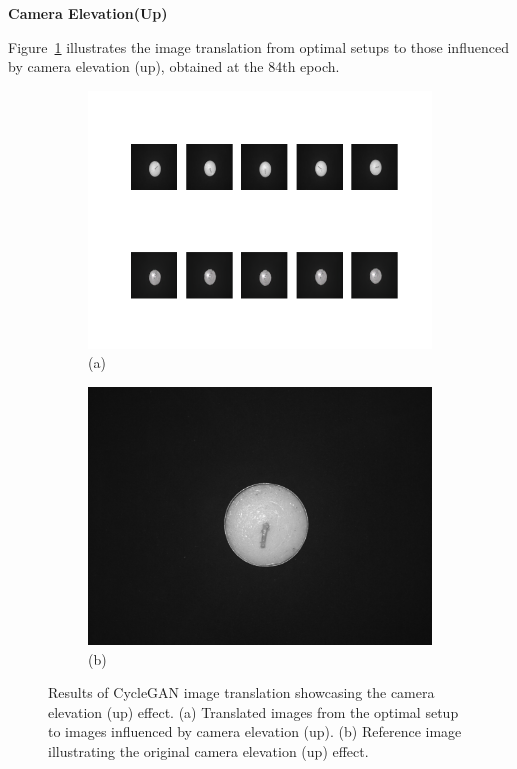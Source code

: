\documentclass[12pt,DIV14,BCOR12mm,a4paper,footinclude=false,headinclude,parskip=half-,twoside,openright,cleardoublepage=empty,toc=index,bibliography=totoc,listof=totoc]{scrreprt}
\numberwithin{equation}{chapter}
\begin{document}
\textbf{Camera Elevation(Up)}

Figure~\ref{fig:camera_elevation_up_result} illustrates the image translation from optimal setups to those influenced by camera elevation (up), obtained at the 84th epoch. 

\begin{figure}
    \centering
    \begin{subfigure}[b]{0.85\textwidth}
        \centering
        \includegraphics[width=\textwidth]{../media/candles_dark.png}
        \caption*{(a)}
    \end{subfigure}
    \hfill
    \begin{subfigure}[b]{0.25\textwidth}
        \centering
        \includegraphics[width=\textwidth]{../media/candles_dark_real.png}
        \caption*{(b)}
    \end{subfigure}
    \caption{Results of CycleGAN image translation showcasing the camera elevation (up) effect. (a) Translated images from the optimal setup to images influenced by camera elevation (up). (b) Reference image illustrating the original camera elevation (up) effect.}
    \label{fig:camera_elevation_up_result}
\end{figure}
\end{document}
